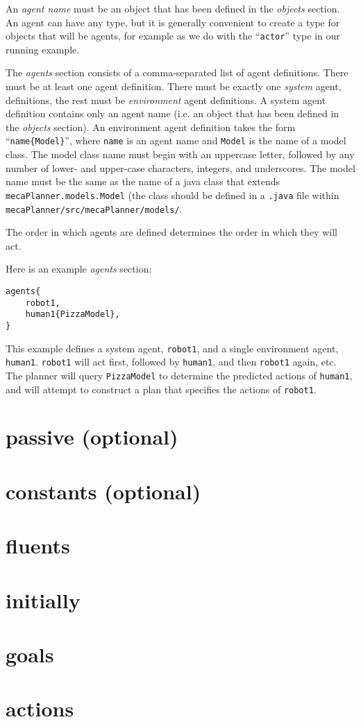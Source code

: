 \documentclass{article}
\begin{document}
An \emph{agent name} must be an object that has been defined in the
\emph{objects} section. An agent can have any type, but it is generally
convenient to create a type for objects that will be agents, for example 
as we do with the ``\texttt{actor}'' type in our running example.

The \emph{agents} section consists of a comma-separated list of agent
definitions. There must be at least one agent definition. There must be exactly
one \emph{system} agent, definitions, the rest must be \emph{environment} agent
definitions. A system agent definition contains only an agent name (i.e. an
object that has been defined in the \emph{objects} section). An environment
agent definition takes the form ``\texttt{name\{Model\}}'', where \texttt{name}
is an agent name and \texttt{Model} is the name of a model class. The model
class name must begin with an uppercase letter, followed by any number of
lower- and upper-case characters, integers, and underscores. The model name must
be the same as the name of a java class that extends
\texttt{mecaPlanner.models.Model} (the class should be defined in a
\texttt{.java} file within \texttt{mecaPlanner/src/mecaPlanner/models/}.

The order in which agents are defined determines the order in which they will
act.

Here is an example \emph{agents} section:
\begin{verbatim}
agents{
    robot1,
    human1{PizzaModel},
}
\end{verbatim}

This example defines a system agent, \texttt{robot1}, and a single environment
agent, \texttt{human1}. \texttt{robot1} will act first, followed by
\texttt{human1}, and then \texttt{robot1} again, etc. The planner will query
\texttt{PizzaModel} to determine the predicted actions of \texttt{human1}, and
will attempt to construct a plan that specifies the actions of \texttt{robot1}.




\section{passive (optional)}




\section{constants (optional)}
\section{fluents}
\section{initially}
\section{goals}
\section{actions}
\end{document}
